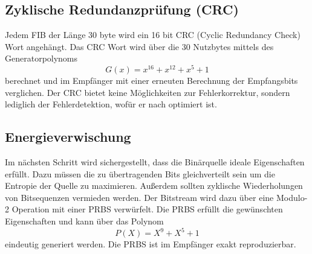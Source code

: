 \subsection{Zyklische Redundanzprüfung (CRC)}
\label{sec:crc}
Jedem \ac{FIB} der Länge 30 byte wird ein 16 bit CRC (Cyclic Redundancy Check) Wort angehängt. Das CRC Wort wird über die 30 Nutzbytes mittels des Generatorpolynoms
\begin{equation}
G(x) = x^{16} + x^{12} + x^5 + 1
\end{equation}
berechnet und im Empfänger mit einer erneuten Berechnung der Empfangsbits verglichen. Der CRC bietet keine Möglichkeiten zur Fehlerkorrektur, sondern lediglich der Fehlerdetektion, wofür er nach \cite{crc:recommendation} optimiert ist.

\subsection{Energieverwischung}
\label{sec:energieverwischung}
Im nächsten Schritt wird sichergestellt, dass die Binärquelle ideale Eigenschaften erfüllt. Dazu müssen die zu übertragenden Bits gleichverteilt sein um die Entropie der Quelle zu maximieren. Außerdem sollten zyklische Wiederholungen von Bitsequenzen vermieden werden. Der Bitstream wird dazu über eine Modulo-2 Operation mit einer \ac{PRBS} verwürfelt. Die \ac{PRBS} erfüllt die gewünschten Eigenschaften und kann über das Polynom
\begin{equation}
\label{eq:energy_dispersal}
P(X) = X^9 + X^5 + 1
\end{equation}
eindeutig generiert werden. Die PRBS ist im Empfänger exakt reproduzierbar.

